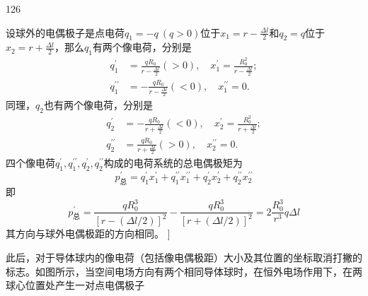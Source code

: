 \begin{solution}{126}
\begin{subsolution}
        设球外的电偶极子是点电荷$q _ { 1 } = - q \ ( q > 0 )$位于$x _ { 1 } = r - \frac { \Delta l } { 2 }$和$q _ { 2 } = q$位于$x _ { 2 } = r + \frac { \Delta l } { 2 }$，那么$q _ { 1 }$有两个像电荷，分别是
        \begin{align}
            q _ {1} ^ {\prime} &= \frac {q R _ {0}}{r - \frac {\Delta l}{2}} (> 0), \quad x _ {1} ^ {\prime} = \frac {R _ {0} ^ {2}}{r - \frac {\Delta l}{2}}; \label{eq:15.s126} \\
            q _ {1} ^ {\prime \prime} &= - \frac {q R _ {0}}{r - \frac {\Delta l}{2}} (< 0), \quad x _ {1} ^ {\prime \prime} = 0. \label{eq:16.s126}
        \end{align}
        同理，$q _ { 2 }$也有两个像电荷，分别是
        \begin{align}
            q _ {2} ^ {\prime} &= - \frac {q R _ {0}}{r + \frac {\Delta l}{2}} (< 0), \quad x _ {2} ^ {\prime} = \frac {R _ {0} ^ {2}}{r + \frac {\Delta l}{2}}; \label{eq:17.s126} \\
            q _ {2} ^ {\prime \prime} &= \frac {q R _ {0}}{r + \frac {\Delta l}{2}} (> 0), \quad x _ {2} ^ {\prime \prime} = 0. \label{eq:18.s126}
        \end{align}
        四个像电荷$q _ { 1 } ^ { \prime } , q _ { 1 } ^ { \prime \prime } , q _ { 2 } ^ { \prime } , q _ { 2 } ^ { \prime \prime }$构成的电荷系统的总电偶极矩为
        \begin{equation}
            p _ {\text {总}} ^ {\prime} = q _ {1} ^ {\prime} x _ {1} ^ {\prime} + q _ {1} ^ {\prime \prime} x _ {1} ^ {\prime \prime} + q _ {2} ^ {\prime} x _ {2} ^ {\prime} + q _ {2} ^ {\prime \prime} x _ {2} ^ {\prime \prime}
            \label{eq:19.s126}
        \end{equation}
        即
        \begin{equation}
            p _ {\text {总}} ^ {\prime} = \frac {q R _ {0} ^ {3}}{\left[ r - (\Delta l / 2) \right] ^ {2}} - \frac {q R _ {0} ^ {3}}{\left[ r + (\Delta l / 2) \right] ^ {2}} = 2 \frac {R _ {0} ^ {3}}{r ^ {3}} q \Delta l
            \label{eq:20.s126}
        \end{equation}
        其方向与球外电偶极距的方向相同。
        ]
    \end{subsolution}
    \begin{subsolution}
        此后，对于导体球内的像电荷（包括像电偶极距）大小及其位置的坐标取消打撇的标志。如图所示，当空间电场方向有两个相同导体球时，在恒外电场作用下，在两球心位置处产生一对点电偶极子
        \begin{equation}

\end{equation}
\end{subsolution}
\end{solution}

